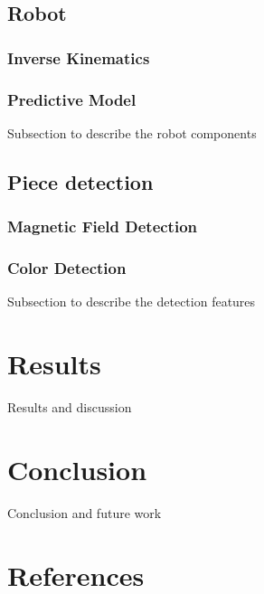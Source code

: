 \documentclass{article}
\begin{document}
\subsection{Robot }
\subsubsection{Inverse Kinematics}
\subsubsection{Predictive Model}
Subsection to describe the robot components

\subsection{Piece detection}
\subsubsection{Magnetic Field Detection}
\subsubsection{Color Detection}
Subsection to describe the detection features

\section{Results}
Results and discussion

\section{Conclusion}
Conclusion and future work

\section{References}
\end{document}
